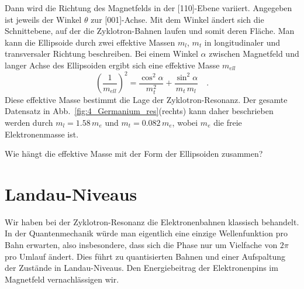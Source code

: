 Dann wird die Richtung des Magnetfelds in der [110]-Ebene variiert.  Angegeben ist jeweils der Winkel $\theta$ zur [001]-Achse. Mit dem Winkel ändert sich die Schnittebene, auf der die Zyklotron-Bahnen laufen und somit deren Fläche. Man kann die Ellipsoide durch zwei effektive Massen $m_l$, $m_t$ in longitudinaler und transversaler Richtung beschreiben. Bei einem Winkel $\alpha$ zwischen Magnetfeld und langer Achse des Ellipsoiden ergibt sich eine effektive Masse $m_{ell}$
\begin{equation}
   \left( \frac{1}{m_{ell}} \right)^2 = \frac{\cos^2 \alpha}{m_t^2} + \frac{\sin^2 \alpha}{m_t \, m_l} \quad .
\end{equation}
Diese effektive Masse bestimmt die Lage der Zyklotron-Resonanz. Der gesamte Datensatz in Abb.~\ref{fig:4_Germanium_res}(rechts) kann daher beschrieben werden durch $m_l = 1.58 \, m_e$ und $m_t =  0.082 \, m_e$, wobei $m_e$ die freie Elektronenmasse ist.



\begin{questions}
   \item Wie hängt die effektive Masse mit der  Form der Ellipsoiden zusammen?
\end{questions}




\section{Landau-Niveaus}

Wir haben bei der Zyklotron-Resonanz die Elektronenbahnen klassisch behandelt. In der Quantenmechanik würde man eigentlich eine einzige Wellenfunktion pro Bahn erwarten, also insbesondere, dass sich die Phase nur um Vielfache von $2\pi$ pro Umlauf ändert. Dies führt zu quantisierten Bahnen und einer Aufspaltung der Zustände in Landau-Niveaus. Den Energiebeitrag der Elektronenpins im Magnetfeld vernachlässigen wir.

